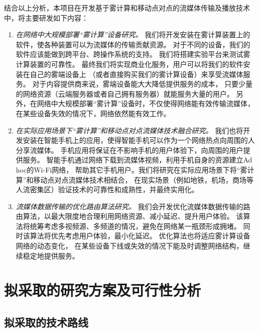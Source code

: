 结合以上分析，本项目在开发基于雾计算和移动点对点的流媒体传输及播放技术中，将主要研发如下内容：
\begin{enumerate}
\item \emph{在网络中大规模部署“雾计算”设备研究。}
我们将开发安装在雾计算装置上的软件，使各种装置可以为流媒体的传输贡献资源。
对于不同的设备，我们的软件应该能做到跨平台、跨操作系统的支持。
我们将搭建实验平台来测试雾计算装置的可靠性。
最终我们将实现商业化服务，用户可以将我们的软件安装在自己的雾端设备上
（或者直接购买我们的雾计算设备）来享受流媒体服务。
对于内容提供商来说，雾端设备能大大降低提供服务的成本，
只要少量的网络资源（云端服务器或者自己拥有服务器）就能服务大量的用户。
另外，在网络中大规模部署“雾计算”设备时，不仅使得网络能有效传输流媒体，
在某些设备失效的情况下，网络依然能有效工作。

\item \emph{在实际应用场景下“雾计算”和移动点对点流媒体技术融合研究。}
我们也将开发安装在智能手机上的应用，使得智能手机可以作为一个网络热点向周围的人分享流媒体。
手机应用将保证在不影响手机的用户体验下，向周围的用户提供服务。
智能手机通过网络下载到流媒体视频，利用手机自身的资源建立Ad hoc的Wi-Fi网络，
帮助其它手机用户。我们将研究在实际应用场景下将“雾计算”和移动点对点流媒体技术相结合，
在现实场景（例如地铁，机场，商场等人流密集区）验证技术的可靠性和成熟性，并最终实用化。

\item \emph{流媒体数据传输的优化路由算法研究。}
我们会开发优化流媒体数据传输的路由算法，以最大限度地合理利用网络资源、减小延迟、提升用户体验。
该算法将统筹考虑多视频源、多频道的情况，避免在网络某一瓶颈形成拥堵。
同时该算法将优先考虑用户体验，最小化延迟。
优化算法也将适应雾计算设备网络的动态变化，
在某些设备下线或失效的情况下能及时调整网络结构，继续稳定地提供服务。
\end{enumerate}

\section{拟采取的研究方案及可行性分析}

\subsection{拟采取的技术路线}


